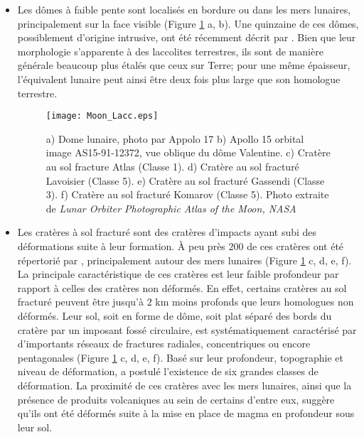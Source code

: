 \begin{itemize}
\item Les dômes  à faible pente sont localisés en  bordure ou dans les
  mers   lunaires,  principalement   sur  la   face  visible   (Figure
  \ref{C1-Moon-magma} a, b).  Une quinzaine de ces dômes, possiblement
  d'origine    intrusive,    ont     été    récemment    décrit    par
  \citet{Wohler:2007it}.  Bien que leur  morphologie s'apparente à des
  laccolites terrestres,  ils sont  de manière générale  beaucoup plus
  étalés que  ceux sur  Terre; pour  une même  épaisseur, l'équivalent
  lunaire  peut ainsi  être deux  fois  plus large  que son  homologue
  terrestre.

  \begin{figure}[htpb]
    \begin{center}
      \graphicspath{ {/Users/thorey/Documents/These/Manuscript/Figure/Chapter1/} }
      \texttt{[image: Moon\_Lacc.eps]}
      \caption{a)  Dome lunaire,  photo  par Appolo  17  b) Apollo  15
        orbital image  AS15-91-12372, vue  oblique du  dôme Valentine.
        c) Cratère au sol fracture Atlas (Classe 1). d) Cratère au sol
        fracturé  Lavoisier (Classe  5).  e)  Cratère au  sol fracturé
        Gassendi  (Classe  3).  f)  Cratère  au  sol fracturé  Komarov
        (Classe   5).   Photo   extraite   de  \textit{Lunar   Orbiter
          Photographic Atlas of the Moon, NASA}}
      \label{C1-Moon-magma}
    \end{center}
  \end{figure}

\item Les  cratères à sol  fracturé sont des cratères  d'impacts ayant
  subi des déformations suite à leur  formation.  À peu près $ 200$ de
  ces   cratères  ont   été  répertorié   par  \citet{Schultz:1976kt},
  principalement autour des  mers lunaires (Figure \ref{C1-Moon-magma}
  c, d, e, f).  La principale caractéristique de ces cratères est leur
  faible profondeur  par rapport à  celles des cratères  non déformés.
  En effet, certains cratères au sol fracturé peuvent être jusqu'à $2$
  km moins profonds que leurs homologues non déformés.  Leur sol, soit
  en  forme de  dôme, soit  plat séparé  des bords  du cratère  par un
  imposant  fossé  circulaire,  est systématiquement  caractérisé  par
  d'importants réseaux de fractures  radiales, concentriques ou encore
  pentagonales (Figure \ref{C1-Moon-magma} c, d, e, f).  Basé sur leur
  profondeur,     topographie     et    niveau     de     déformation,
  \citet{Schultz:1976kt} a postulé l'existence  de six grandes classes
  de  déformation.   La  proximité  de  ces  cratères  avec  les  mers
  lunaires, ainsi que  la présence de produits volcaniques  au sein de
  certains d'entre  eux, suggère  qu'ils ont été  déformés suite  à la
  mise en place de magma en profondeur sous leur sol.
\end{itemize}

